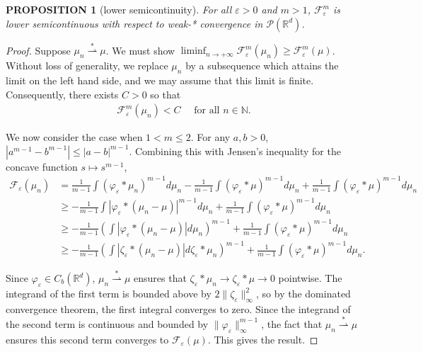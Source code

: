 \documentclass[11pt,leqno]{amsart}
\newtheorem{prop}[thm]{PROPOSITION}
\theoremstyle{definition}
\newcommand{\Rd}{{\mathord{\mathbb R}^d}}
\newcommand{\wsto}{\stackrel{*}{\rightharpoonup}}
\newcommand{\F}{\mathcal{F}}
\def\P{{\mathcal P}}
\def\e{\varepsilon}
\def\F{\mathcal{F}}
\begin{document}
\begin{prop}[lower semicontinuity] \label{lower semicontinuity}
For all $\e >0$ and $m > 1$, $\F^m_\e$ is lower semicontinuous with respect to weak-* convergence in $\P(\Rd)$.
\end{prop}
\begin{proof}
Suppose $\mu_n \wsto \mu$. We must show $\liminf_{n \to +\infty} \F^m_\e(\mu_n) \geq \F^m_\e(\mu)$. Without loss of generality, we replace $\mu_n$ by a subsequence which attains the limit on the left hand side, and we may assume that this limit is finite. Consequently, there exists $C>0$ so that 
\begin{align} \label{lower semicty ineq 0} 
\F^m_\e(\mu_n) < C \quad \text{ for all } n \in \mathbb{N} .
\end{align}

We now consider the case when $1 < m \leq 2$. For any $a,b >0$, $|a^{m-1} -b^{m-1}| \leq |a-b|^{m-1}$. Combining this with Jensen's inequality for the concave function $s\mapsto s^{m-1}$,
\begin{align} \label{lower semicty ineq 1}
 \F_\e(\mu_n) &= \frac{1}{m-1} \int (\varphi_\e *\mu_n)^{m-1} d \mu_n - \frac{1}{m-1} \int (\varphi_\e *\mu)^{m-1} d \mu_n + \frac{1}{m-1} \int (\varphi_\e *\mu)^{m-1} d \mu_n   \\
&\geq - \frac{1}{m-1} \int |\varphi_\e *(\mu_n - \mu)|^{m-1} d \mu_n +  \frac{1}{m-1} \int (\varphi_\e *\mu)^{m-1} d \mu_n \nonumber \\
&\geq - \frac{1}{m-1} \left(  \int |\varphi_\e *(\mu_n - \mu)| d \mu_n \right)^{m-1} +  \frac{1}{m-1} \int (\varphi_\e *\mu)^{m-1} d \mu_n \nonumber \\
&\geq - \frac{1}{m-1} \left(  \int |\zeta_\e *(\mu_n - \mu)| d \zeta_\e*\mu_n \right)^{m-1} +  \frac{1}{m-1} \int (\varphi_\e *\mu)^{m-1} d \mu_n . \nonumber
 \end{align}

 Since $\varphi_\e \in C_b(\Rd)$, $\mu_n \wsto \mu$ ensures that $\zeta_\e * \mu_n \to \zeta_\e* \mu \to 0$ pointwise. The integrand of the first term is bounded above by $2\|\zeta_\e\|_\infty^2$, so by the dominated convergence theorem, the first integral converges to zero. Since the integrand of the second term is continuous and bounded by $\|\varphi_\e\|_\infty^{m-1}$, the fact that $\mu_n \wsto \mu$ ensures this second term converges to $\F_\e(\mu)$. This gives the result.


\end{proof}
\end{document}
